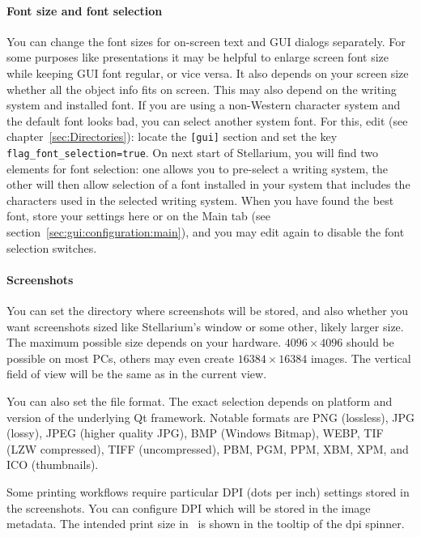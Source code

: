\paragraph{Font size and font selection}  You can change the font sizes for on-screen
text and GUI dialogs separately.  For some purposes like presentations
it may be helpful to enlarge screen font size while keeping GUI font
regular, or vice versa.  It also depends on your screen size whether
all the object info fits on screen. This may also depend on the
writing system and installed font. If you are using a non-Western
character system and the default font looks bad, you can select
another system font. For this, edit  (see
chapter~\ref{sec:Directories}): locate the \texttt{[gui]} section and
set the key \texttt{flag\_font\_selection=true}. On next start of
Stellarium, you will find two elements for font selection: one allows
you to pre-select a writing system, the other will then allow
selection of a font installed in your system that includes the
characters used in the selected writing system. When you have found
the best font, store your settings here or on the Main tab (see
section~\ref{sec:gui:configuration:main}), and you may edit
 again to disable the font selection switches.

\paragraph{Screenshots} You can set the directory where screenshots
will be stored, and  also whether you want
screenshots sized like Stellarium's window or some other, likely
larger size. The maximum possible size depends on your
hardware. $4096\times4096$ should be possible on most PCs, others may
even create $16384\times16384$ images. The vertical field of view will be the same as in the current view.

You can also set  the file format. The exact selection depends on
platform and version of the underlying Qt framework. Notable formats are PNG (lossless), JPG (lossy),
JPEG (higher quality JPG), BMP (Windows Bitmap), WEBP, TIF (LZW compressed), TIFF (uncompressed),
PBM, PGM, PPM, XBM, XPM, and ICO (thumbnails).

Some printing workflows require particular DPI (dots per inch)
settings stored in the screenshots.  You can
configure DPI which will be stored in the image metadata. The intended
print size in \mm\ is shown in the tooltip of the dpi spinner.

